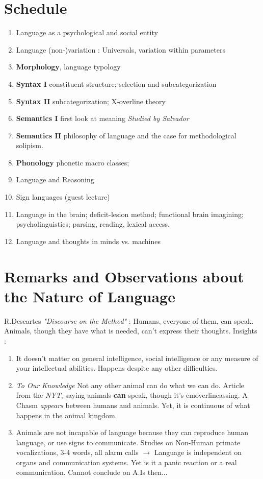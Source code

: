 \documentclass{cours}
\begin{document}
\section*{Schedule}
\begin{enumerate}
    \item Language as a psychological and social entity
    \item Language (non-)variation : Universals, variation within parameters
    \item \textbf{Morphology}, language typology
    \item \textbf{Syntax I} constituent structure; selection and subcategorization
    \item \textbf{Syntax II} subcategorization; X-overline theory
    \item \textbf{Semantics I} first look at meaning \textsl{Studied by Salvador}
    \item \textbf{Semantics II} philosophy of language and the case for methodological solipism.
    \item \textbf{Phonology} phonetic macro classes;
    \item Language and Reasoning
    \item Sign languages (guest lecture)
    \item Language in the brain; deficit-lesion method; functional brain imagining; psycholinguistics; parsing, reading, lexical access.
    \item Language and thoughts in minds vs. machines
\end{enumerate}

\section{Remarks and Observations about the Nature of Language}
R.Descartes \textit{"Discourse on the Method"} : Humans, everyone of them, can speak. Animals, though they have what is needed, can't express their thoughts.
Insights :
\begin{enumerate}
    \item It doesn't matter on general intelligence, social intelligence or any measure of your intellectual abilities. Happens despite any other difficulties.
    \item \emph{To Our Knowledge} Not any other animal can do what we can do. Article from the \textit{NYT}, saying animals \textbf{can} speak, though it's emoverlineassing. A Chasm \textit{appears} between humans and animals. Yet, it is continuous of what happens in the animal kingdom.
    \item Animals are not incapable of language because they can reproduce human language, or use signs to communicate. Studies on Non-Human primate vocalizations, 3-4 words, all alarm calls $\rightarrow$ Language is independent on organs and communication systems. Yet is it a panic reaction or a real communication. Cannot conclude on A.Is then...
\end{enumerate}
\end{document}
